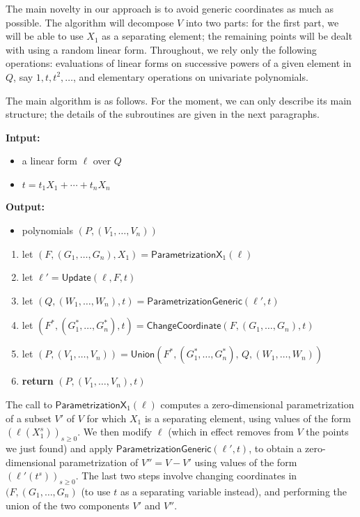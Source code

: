 \documentclass[12pt]{article}
\begin{document}
The main novelty in our approach is to avoid generic coordinates as
much as possible. The algorithm will decompose $V$ into two parts: for
the first part, we will be able to use $X_1$ as a separating element;
the remaining points will be dealt with using a random linear
form. Throughout, we rely only the following operations: evaluations
of linear forms on successive powers of a given element in $Q$, say
$1,t,t^2,\dots$, and elementary operations on univariate polynomials.

The main algorithm is as follows. For the moment, we can only describe
its main structure; the details of the subroutines are given in the
next paragraphs.

\begin{algorithm}[H]
	\caption{$\mathsf{Parametrization}(\ell,t)$} {\bf
		Intput:} \vspace{-0.5em}
	\begin{itemize}\setlength\itemsep{0em}
		\item a linear form $\ell$ over $Q$
		\item $t=t_1 X_1 + \cdots + t_n X_n$
	\end{itemize}
	{\bf Output:} \vspace{-0.5em}
	\begin{itemize}\setlength\itemsep{0em}
		\item polynomials $(P,(V_1,\dots,V_n))$
	\end{itemize}
	\begin{enumerate}
		\item let $(F,(G_1,\dots,G_n),X_1)=\mathsf{ParametrizationX}_1(\ell)$
		\item let $\ell'=\mathsf{Update}(\ell,F,t)$
		\item let $(Q,(W_1,\dots,W_n),t)=\mathsf{ParametrizationGeneric}(\ell',t)$
		\item let $(F^*,(G^*_1,\dots,G^*_n),t)=\mathsf{ChangeCoordinate}(F,(G_1,\dots,G_n),t)$
		\item let  $(P,(V_1,\dots,V_n))=\mathsf{Union}(F^*,(G^*_1,\dots,G^*_n),\, Q,(W_1,\dots,W_n))$
		\item \textbf{return} $(P,(V_1,\dots,V_n),t)$
	\end{enumerate}
\end{algorithm}

The call to $\mathsf{ParametrizationX}_1(\ell)$ computes a
zero-dimensional parametrization of a subset $V'$ of $V$ for which
$X_1$ is a separating element, using values of the form
$(\ell(X_1^s))_{s \ge 0}$. We then modify $\ell$ (which in effect
removes from $V$ the points we just found) and apply
$\mathsf{ParametrizationGeneric}(\ell',t)$, to obtain a
zero-dimensional parametrization of $V''=V-V'$ using values of the form
$(\ell'(t^s))_{s \ge 0}$. The last two steps involve changing
coordinates in $(F,(G_1,\dots,G_n)$ (to use $t$ as a separating
variable instead), and performing the union of the two components $V'$
and $V''$.
\end{document}
